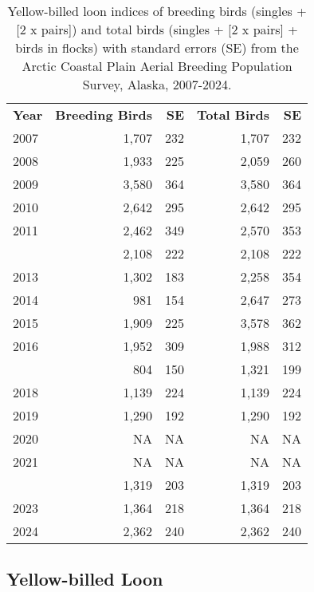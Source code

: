 \documentclass[
]{article}
\begin{document}
\begin{longtable}[t]{lrrrr}

\caption{\label{tbl-YBLO}Yellow-billed loon indices of breeding birds
(singles + {[}2 x pairs{]}) and total birds (singles + {[}2 x pairs{]} +
birds in flocks) with standard errors (SE) from the Arctic Coastal Plain
Aerial Breeding Population Survey, Alaska, 2007-2024.}

\tabularnewline

\\
\toprule
\textbf{Year} & \textbf{Breeding Birds} & \textbf{SE} & \textbf{Total Birds} & \textbf{SE}\\
\midrule
2007 & 1,707 & 232 & 1,707 & 232\\
2008 & 1,933 & 225 & 2,059 & 260\\
2009 & 3,580 & 364 & 3,580 & 364\\
2010 & 2,642 & 295 & 2,642 & 295\\
2011 & 2,462 & 349 & 2,570 & 353\\
\addlinespace
2012 & 2,108 & 222 & 2,108 & 222\\
2013 & 1,302 & 183 & 2,258 & 354\\
2014 & 981 & 154 & 2,647 & 273\\
2015 & 1,909 & 225 & 3,578 & 362\\
2016 & 1,952 & 309 & 1,988 & 312\\
\addlinespace
2017 & 804 & 150 & 1,321 & 199\\
2018 & 1,139 & 224 & 1,139 & 224\\
2019 & 1,290 & 192 & 1,290 & 192\\
2020 & NA & NA & NA & NA\\
2021 & NA & NA & NA & NA\\
\addlinespace
2022 & 1,319 & 203 & 1,319 & 203\\
2023 & 1,364 & 218 & 1,364 & 218\\
2024 & 2,362 & 240 & 2,362 & 240\\
\bottomrule

\end{longtable}

\endgroup{}

\newpage{}

\subsection*{Yellow-billed Loon}\label{yellow-billed-loon-2}
\end{document}
